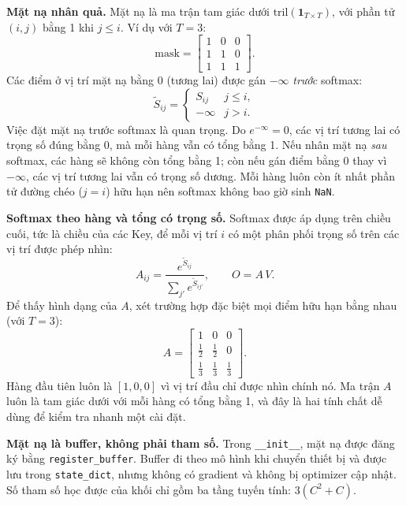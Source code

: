 \textbf{Mặt nạ nhân quả.} Mặt nạ là ma trận tam giác dưới
$\mathrm{tril}(\mathbf{1}_{T \times T})$, với phần tử $(i, j)$ bằng 1 khi $j \le i$.
Ví dụ với $T = 3$:
\begin{equation}
\mathrm{mask} = \begin{bmatrix} 1 & 0 & 0 \\ 1 & 1 & 0 \\ 1 & 1 & 1 \end{bmatrix}.
\end{equation}
Các điểm ở vị trí mặt nạ bằng 0 (tương lai) được gán $-\infty$ \emph{trước}
softmax:
\begin{equation}
\tilde{S}_{ij} = \begin{cases} S_{ij} & j \le i, \\ -\infty & j > i. \end{cases}
\end{equation}
Việc đặt mặt nạ trước softmax là quan trọng. Do $e^{-\infty} = 0$, các vị trí
tương lai có trọng số đúng bằng 0, mà mỗi hàng vẫn có tổng bằng 1. Nếu nhân mặt
nạ \emph{sau} softmax, các hàng sẽ không còn tổng bằng 1; còn nếu gán điểm bằng
0 thay vì $-\infty$, các vị trí tương lai vẫn có trọng số dương. Mỗi hàng luôn
còn ít nhất phần tử đường chéo ($j = i$) hữu hạn nên softmax không bao giờ sinh
\texttt{NaN}.

\textbf{Softmax theo hàng và tổng có trọng số.} Softmax được áp dụng trên chiều
cuối, tức là chiều của các Key, để mỗi vị trí $i$ có một phân phối trọng số trên
các vị trí được phép nhìn:
\begin{equation}
A_{ij} = \frac{e^{\tilde{S}_{ij}}}{\sum_{j'} e^{\tilde{S}_{ij'}}}, \qquad
O = A\,V.
\end{equation}
Để thấy hình dạng của $A$, xét trường hợp đặc biệt mọi điểm hữu hạn bằng nhau
(với $T = 3$):
\begin{equation}
A = \begin{bmatrix} 1 & 0 & 0 \\ \tfrac12 & \tfrac12 & 0 \\ \tfrac13 & \tfrac13 & \tfrac13 \end{bmatrix}.
\end{equation}
Hàng đầu tiên luôn là $[1, 0, 0]$ vì vị trí đầu chỉ được nhìn chính nó. Ma trận
$A$ luôn là tam giác dưới với mỗi hàng có tổng bằng 1, và đây là hai tính chất
dễ dùng để kiểm tra nhanh một cài đặt.

\textbf{Mặt nạ là buffer, không phải tham số.} Trong \texttt{\_\_init\_\_}, mặt nạ
được đăng ký bằng \texttt{register\_buffer}. Buffer đi theo mô hình khi chuyển
thiết bị và được lưu trong \texttt{state\_dict}, nhưng không có gradient và không
bị optimizer cập nhật. Số tham số học được của khối chỉ gồm ba tầng tuyến tính:
$3(C^2 + C)$.

